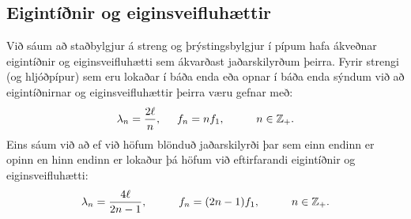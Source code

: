 \ifdefined \wholebook \else\documentclass[oneside]{book}\usepackage{EdlBook}\graphicspath{{figures/}}
\begin{document}
\subsection*{Eigintíðnir og eiginsveifluhættir}

\begin{tcolorbox}
Við sáum að staðbylgjur á streng og þrýstingsbylgjur í pípum hafa ákveðnar eigintíðnir og eiginsveifluhætti sem ákvarðast jaðarskilyrðum þeirra. Fyrir strengi (og hljóðpípur) sem eru lokaðar í báða enda eða opnar í báða enda sýndum við að eigintíðnirnar og eiginsveifluhættir þeirra væru gefnar með:
\begin{align*}
    \lambda_{n} = \frac{2\ell}{n}, \hspace{0.5cm} f_n = nf_1, \hspace{1cm} n \in \mathbb{Z}_+.
\end{align*}
Eins sáum við að ef við höfum blönduð jaðarskilyrði þar sem einn endinn er opinn en hinn endinn er lokaður þá höfum við eftirfarandi eigintíðnir og eiginsveifluhætti:
\begin{align*}
    \lambda_n = \frac{4\ell}{2n-1}, \hspace{1cm} f_n = (2n-1)f_1, \hspace{1cm} n \in \mathbb{Z}_+.
\end{align*}
\end{tcolorbox}
\end{document}
